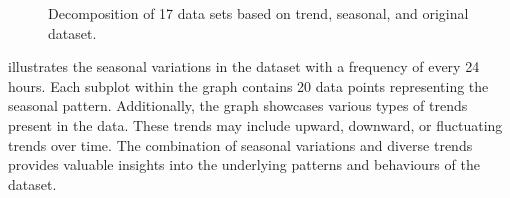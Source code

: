 \documentclass[a4paper, fleqn]{cas-sc}
\theoremstyle{definition}
\theoremstyle{remark}
\begin{document}
\begin{itemize}
\begin{figure}[h!]
  \centering
  \caption{Decomposition of 17 data sets based on trend, seasonal, and original dataset.}
  \label{Eda}
\end{figure}

\par {} illustrates the seasonal variations in the dataset with a frequency of every 24 hours. Each subplot within the graph contains 20 data points representing the seasonal pattern. Additionally,  the graph showcases various types of trends present in the data. These trends may include upward, downward,  or fluctuating trends over time. The combination of seasonal variations and diverse trends provides valuable insights into the underlying patterns and behaviours of the dataset.
\end{itemize}
\end{document}
